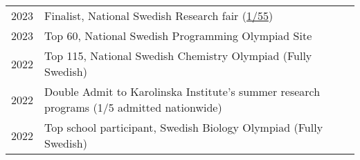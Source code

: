 
\begin{longtable}[l]{@{}p{} p{}}

    2023 & Finalist, National Swedish Research fair (\href{https://partner.projectboard.world/viewAll/?tag=UtstallningenUngaForskare2023}{1/55}) \\

    2023 & Top 60, National Swedish Programming Olympiad Site \\

    2022 & Top 115, National Swedish Chemistry Olympiad (Fully Swedish)\\

    2022 & Double Admit to Karolinska Institute's summer research programs (1/5 admitted nationwide)\\

    2022 & Top school participant, Swedish Biology Olympiad (Fully Swedish)\\
   
\end{longtable}

